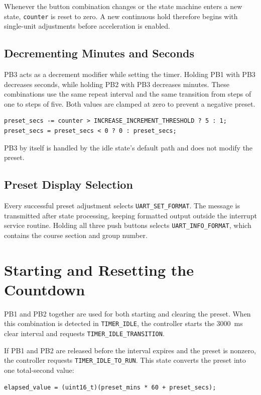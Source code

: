 \documentclass[11pt]{article}
\newcommand{\state}[1]{\texttt{#1}}
\newcommand{\code}[1]{\texttt{#1}}
\begin{document}
Whenever the button combination changes or the state machine enters a new state, \code{counter} is reset to zero. A new continuous hold therefore begins with single-unit adjustments before acceleration is enabled.

\subsection{Decrementing Minutes and Seconds}

PB3 acts as a decrement modifier while setting the timer. Holding PB1 with PB3 decreases seconds, while holding PB2 with PB3 decreases minutes. These combinations use the same repeat interval and the same transition from steps of one to steps of five. Both values are clamped at zero to prevent a negative preset.

\begin{verbatim}
preset_secs -= counter > INCREASE_INCREMENT_THRESHOLD ? 5 : 1;
preset_secs = preset_secs < 0 ? 0 : preset_secs;
\end{verbatim}

PB3 by itself is handled by the idle state's default path and does not modify the preset.

\subsection{Preset Display Selection}

Every successful preset adjustment selects \code{UART\_SET\_FORMAT}. The message is transmitted after state processing, keeping formatted output outside the interrupt service routine. Holding all three push buttons selects \code{UART\_INFO\_FORMAT}, which contains the course section and group number.
\pagebreak
\section{Starting and Resetting the Countdown}

PB1 and PB2 together are used for both starting and clearing the preset. When this combination is detected in \state{TIMER\_IDLE}, the controller starts the 3000~ms clear interval and requests \state{TIMER\_IDLE\_TRANSITION}.

If PB1 and PB2 are released before the interval expires and the preset is nonzero, the controller requests \state{TIMER\_IDLE\_TO\_RUN}. This state converts the preset into one total-second value:

\begin{verbatim}
elapsed_value = (uint16_t)(preset_mins * 60 + preset_secs);
\end{verbatim}
\end{document}
